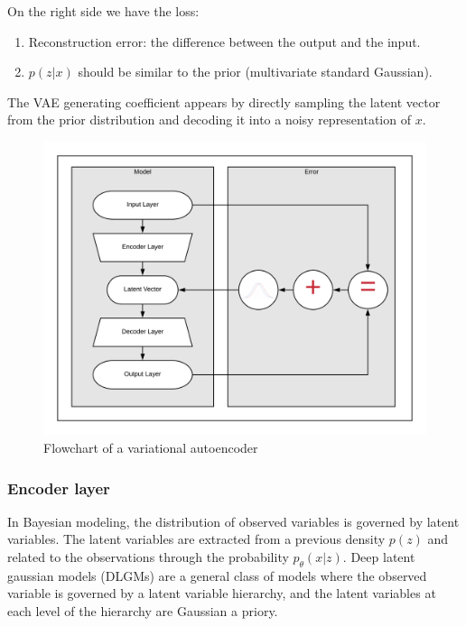 \documentclass[nouppercase]{ifmbe}
\begin{document}
On the right side we have the loss:

\begin{enumerate}
    \item Reconstruction error: the difference between the output and the input.
    \item $p(z|x)$ should be similar to the prior (multivariate standard Gaussian).
\end{enumerate}

The VAE generating coefficient appears by directly sampling the latent vector from the prior distribution and decoding it into a noisy representation of $x$\cite{Welling}.

\begin{figure}
	\begin{center}
	\includegraphics[width=.8\linewidth]{figuras/VAE_Diagram.png}
	\end{center}
	\caption{Flowchart of a variational autoencoder} \label{fig2}
\end{figure}

 

\subsubsection{Encoder layer}

In Bayesian modeling, the distribution of observed variables is governed by latent variables. The latent variables are extracted from a previous density $p(z)$ and related to the observations through the probability $p_\theta(x|z)$. Deep latent gaussian models (DLGMs) are a general class of models where the observed variable is governed by a latent variable hierarchy, and the latent variables at each level of the hierarchy are Gaussian a priory\cite{Rezende2014}.
\end{document}
